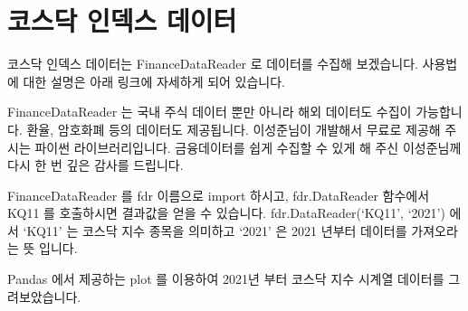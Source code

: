 \documentclass[letterpaper,10pt,english]{jupyterBook}
\begin{document}
\part{코스닥 인덱스 데이터}
\label{\detokenize{chapter4/4.4.2_Data_Collection:id1}}\label{\detokenize{chapter4/4.4.2_Data_Collection::doc}}
\sphinxAtStartPar
코스닥 인덱스 데이터는 FinanceDataReader 로 데이터를 수집해 보겠습니다.
사용법에 대한 설명은 아래 링크에 자세하게 되어 있습니다.

\sphinxAtStartPar
FinanceDataReader 는 국내 주식 데이터 뿐만 아니라 해외 데이터도 수집이 가능합니다. 환율, 암호화폐 등의 데이터도 제공됩니다.
이성준님이 개발해서 무료로 제공해 주시는 파이썬 라이브러리입니다. 금융데이터를 쉽게 수집할 수 있게 해 주신 이성준님께 다시 한 번 깊은 감사를 드립니다.

\sphinxAtStartPar
FinanceDataReader 를 fdr 이름으로 import 하시고, fdr.DataReader 함수에서 KQ11 를 호출하시면 결과값을 얻을 수 있습니다.
fdr.DataReader(‘KQ11’, ‘2021’) 에서 ‘KQ11’ 는 코스닥 지수 종목을 의미하고 ‘2021’ 은 2021 년부터 데이터를 가져오라는 뜻 입니다.

\sphinxAtStartPar
Pandas 에서 제공하는 plot 를 이용하여 2021년 부터 코스닥 지수 시계열 데이터를 그려보았습니다.
\end{document}
